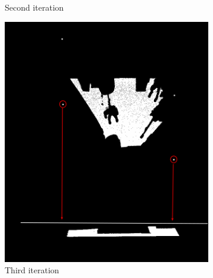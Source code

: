 \begin{figure}[H]
\begin{subfigure}[b]{0.4\linewidth}
					\caption{Second iteration} 
					\label{fig4Adjust:b} 
					\vspace{4ex}
				\end{subfigure} 
				\begin{subfigure}[b]{0.4\linewidth}
					\centering
					\includegraphics[width=0.95\linewidth]{"Includes/images/Project Points/F-3"} 
					\caption{Third iteration} 
					\label{fig4Adjust:c} 
				\end{subfigure}
				\begin{subfigure}[b]{0.4\linewidth}
					\centering

\end{subfigure}
\end{figure}
